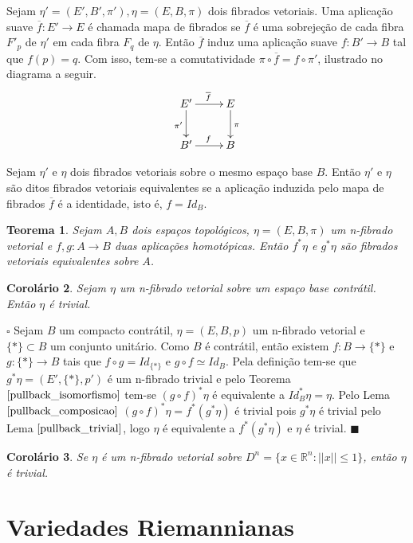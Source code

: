 \documentclass[12pt]{book}
\newtheorem{teorema}{Teorema}[section]
\newtheorem{corolario}[teorema]{Corolário}
\newenvironment{prova}[1]{$\square$ #1}{\hfill$\blacksquare$}
\newcommand{\norma}[1]{||#1||}
\newcommand{\real}[1]{\mathbb{R}^{#1}}
\begin{document}
	Sejam $ \eta'=(E',B',\pi'), \eta=(E,B,\pi)$ dois fibrados vetoriais.  Uma aplicação suave $\overline{f}:E'\to E$ é chamada mapa de fibrados se $\overline{f}$ é uma sobrejeção de cada fibra $F'_{p}$ de $\eta'$ em cada fibra $F_{q}$ de $\eta$. Então $\overline{f}$ induz uma aplicação suave $f:B'\to B$ tal que $f(p)=q$. Com isso, tem-se a comutatividade $\pi\circ \overline{f} = f\circ\pi'$, ilustrado no diagrama a seguir. 
	$$
	\xymatrix{
		E'\ar[d]_{\pi'}\ar[r]^{\overline{f}} & E\ar[d]^{\pi}
		\\
		B'\ar[r]^{f} & B
	}
	$$
	
	
	Sejam $\eta'$ e $\eta$ dois fibrados vetoriais sobre o mesmo espaço base $B$. Então $\eta'$ e $\eta$ são ditos fibrados vetoriais equivalentes se a aplicação induzida pelo mapa de fibrados $\overline{f}$ é a identidade, isto é, $f=Id_{B}$.
	
	\begin{teorema}\label{pullback_isomorfismo}
		Sejam $A, B$ dois espaços topológicos, $\eta=(E, B, \pi)$ um n-fibrado vetorial e $f,g: A\to B$ duas aplicações homotópicas. Então $f^{*}\eta $ e $g^{*}\eta$ são fibrados vetoriais equivalentes sobre $A$.
	\end{teorema}
	
	\begin{corolario}\label{pullback_contratil}
		Sejam $\eta$ um n-fibrado vetorial sobre um espaço base contrátil. Então $\eta$ é trivial.
	\end{corolario}
	\begin{prova}
		Sejam $B$ um compacto contrátil, $\eta=(E, B, p)$ um n-fibrado vetorial e $\{*\} \subset B$ um conjunto unitário. Como $B$ é contrátil, então existem $f:B\to \{*\}$ e $g:\{*\}\to B$ tais que $f\circ g = Id_{\{*\}}$ e $g\circ f \simeq Id_{B}$. Pela definição tem-se que $g^{*}\eta = (E', \{*\}, p')$ é um n-fibrado trivial e pelo Teorema $\ref{pullback_isomorfismo}$ tem-se $(g\circ f)^{*}\eta $ é equivalente a $ Id_{B}^{*}\eta = \eta$. Pelo Lema $\ref{pullback_composicao}$ $(g\circ f)^{*}\eta = f^{*}(g^{*}\eta) $ é trivial pois $g^{*}\eta$ é trivial pelo Lema $\ref{pullback_trivial}$, logo $ \eta $ é equivalente a $f^{*}(g^{*}\eta)$ e $\eta$ é trivial.
	\end{prova}
	
	\begin{corolario}
		Se $\eta$ é um n-fibrado vetorial sobre $D^{n} = \{ x\in \real{n}:\norma{x}\leq 1\}$, então $\eta$ é trivial.
	\end{corolario}

	\chapter{Variedades Riemannianas}\label{apendice_variedade_riemanniana}
	
\end{document}
